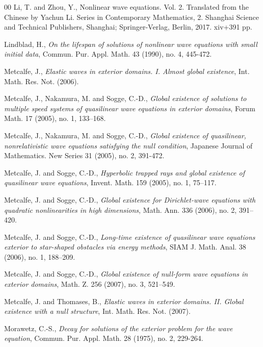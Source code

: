 \documentclass[11pt, reqno]{amsart}
\theoremstyle{definition}
\theoremstyle{remark}
\theoremstyle{definition}
\numberwithin{equation}{section}
\numberwithin{equation}{section}
\begin{document}
\begin{thebibliography}{00}
{Li, T. and Zhou, Y.}, Nonlinear wave equations. Vol. 2. Translated from the Chinese by Yachun Li. Series in Contemporary Mathematics, 2. Shanghai Science and 
Technical Publishers, Shanghai; Springer-Verlag, Berlin, 2017. xiv+391 pp.

{Lindblad, H.}, \textit{\emph On the lifespan of solutions of nonlinear wave equations with small initial data},
Commun. Pur. Appl. Math. 43 (1990), no. 4, 445-472.


{Metcalfe, J.}, \textit{\emph Elastic waves in exterior domains. I.
Almost global existence}, Int. Math. Res. Not. (2006).


{Metcalfe, J., Nakamura, M. and Sogge, C.-D.}, \textit{\emph Global
existence of solutions to multiple speed systems of quasilinear wave
equations in exterior domains}, Forum Math. 17 (2005), no. 1, 133--168.

{Metcalfe, J., Nakamura, M. and Sogge, C.-D.}, \textit{\emph Global existence of quasilinear, nonrelativistic wave equations satisfying the null condition}, 
Japanese Journal of Mathematics. New Series 31 (2005), no. 2, 391-472.



{Metcalfe, J. and Sogge, C.-D.}, \textit{\emph Hyperbolic trapped
rays and global existence of quasilinear wave equations}, Invent.
Math. 159 (2005), no. 1, 75--117.

{Metcalfe, J. and Sogge, C.-D.}, \textit{\emph Global existence for
Dirichlet-wave equations with quadratic nonlinearities in high dimensions},
Math. Ann. 336 (2006), no. 2, 391--420.


{Metcalfe, J. and Sogge, C.-D.}, \textit{\emph Long-time existence
of quasilinear wave equations exterior to star-shaped obstacles via
energy methods}, SIAM J. Math. Anal. 38 (2006), no. 1, 188--209.

{Metcalfe, J. and Sogge, C.-D.}, \textit{\emph Global existence of
null-form wave equations in exterior domains}, Math. Z. 256 (2007),
no. 3, 521--549.




{Metcalfe, J. and Thomases, B.}, \textit{\emph Elastic waves in
exterior domains. II. Global existence with a null structure}, Int.
Math. Res. Not. (2007).


{Morawetz, C.-S.}, \textit{\emph
Decay for solutions of the exterior problem for the wave equation}, Commun. Pur. Appl. Math. 28 (1975), no. 2, 229-264.





\end{thebibliography}
\end{document}
